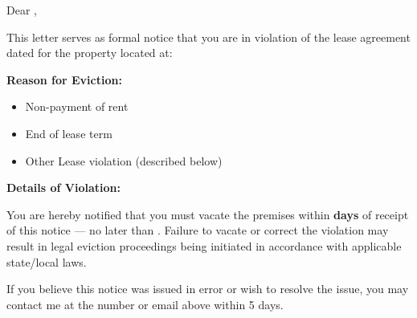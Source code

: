
Dear \recipientName{},

This letter serves as formal notice that you are in violation of the lease agreement dated \LeaseStartDate{}  for the property located at:

\LeaseLocationAddress{}

\textbf{Reason for Eviction:}
\begin{itemize}
  \item[$\square$] Non-payment of rent
  \item[$\square$] End of lease term
  \item[$\square$] Other Lease violation (described below)
\end{itemize}

\textbf{Details of Violation:}

\EvictionReason{}

You are hereby notified that you must vacate the premises within \textbf{\NoticeDays{} days} of receipt of this notice — no later than \MoveOutDate{}. Failure to vacate or correct the violation may result in legal eviction proceedings being initiated in accordance with applicable state/local laws.

If you believe this notice was issued in error or wish to resolve the issue, you may contact me at the number or email above within 5 days.